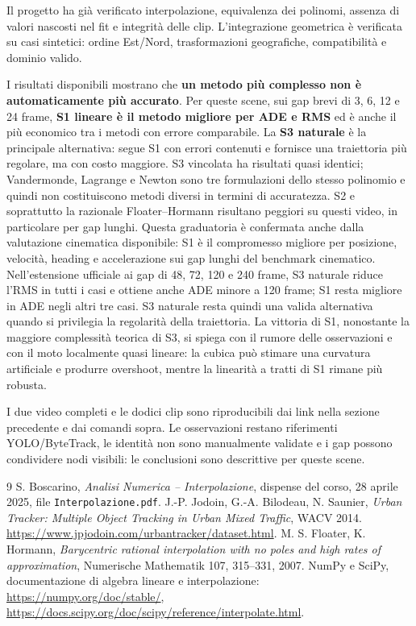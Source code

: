 \documentclass[11pt,a4paper]{article}
\numberwithin{equation}{section}
\begin{document}
Il progetto ha già verificato interpolazione, equivalenza dei polinomi,
assenza di valori nascosti nel fit e integrità delle clip. L'integrazione
geometrica è verificata su casi sintetici: ordine Est/Nord, trasformazioni
geografiche, compatibilità e dominio valido.

I risultati disponibili mostrano che \textbf{un metodo più complesso
non è automaticamente più accurato}. Per queste scene, sui gap brevi di 3, 6,
12 e 24 frame, \textbf{S1 lineare è il metodo migliore per ADE e RMS}
ed è anche il più economico tra i metodi con errore comparabile. La
\textbf{S3 naturale} è la principale alternativa: segue S1 con errori
contenuti e fornisce una traiettoria più regolare, ma con costo maggiore.
S3 vincolata ha risultati quasi identici; Vandermonde, Lagrange e Newton
sono tre formulazioni dello stesso polinomio e quindi non costituiscono
metodi diversi in termini di accuratezza. S2 e soprattutto la razionale
Floater--Hormann risultano peggiori su questi video, in particolare per
gap lunghi. Questa graduatoria è confermata anche dalla valutazione cinematica
disponibile: S1 è il compromesso migliore per posizione, velocità, heading
e accelerazione sui gap lunghi del benchmark cinematico. Nell'estensione
ufficiale ai gap di 48, 72, 120 e 240 frame, S3 naturale riduce l'RMS in
tutti i casi e ottiene anche ADE minore a 120 frame; S1 resta migliore in
ADE negli altri tre casi. S3 naturale resta quindi una valida alternativa
quando si privilegia la regolarità della traiettoria. La vittoria di S1,
nonostante la maggiore complessità teorica di S3, si spiega con il rumore
delle osservazioni e con il moto localmente quasi lineare: la cubica può
stimare una curvatura artificiale e produrre overshoot, mentre la linearità
a tratti di S1 rimane più robusta.

I due video completi e le dodici clip sono riproducibili dai link nella
sezione precedente e dai comandi sopra. Le osservazioni restano
riferimenti YOLO/ByteTrack, le identità non sono manualmente validate e i
gap possono condividere nodi visibili: le conclusioni sono descrittive
per queste scene.

\begin{thebibliography}{9}
S. Boscarino, \emph{Analisi Numerica -- Interpolazione}, dispense del corso,
28 aprile 2025, file \texttt{Interpolazione.pdf}.
J.-P. Jodoin, G.-A. Bilodeau, N. Saunier,
\emph{Urban Tracker: Multiple Object Tracking in Urban Mixed Traffic}, WACV 2014.
\url{https://www.jpjodoin.com/urbantracker/dataset.html}.
M. S. Floater, K. Hormann,
\emph{Barycentric rational interpolation with no poles and high rates of approximation},
Numerische Mathematik 107, 315--331, 2007.
NumPy e SciPy, documentazione di algebra lineare e interpolazione:
\url{https://numpy.org/doc/stable/},
\url{https://docs.scipy.org/doc/scipy/reference/interpolate.html}.
\end{thebibliography}
\end{document}
